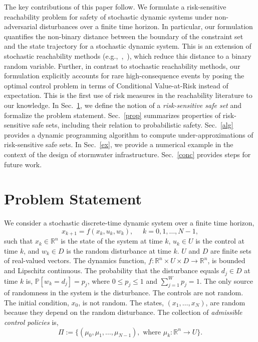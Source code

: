 \documentclass[letterpaper, 10 pt, conference]{ieeeconf}  %
\begin{document}
The key contributions of this paper follow.
We formulate a risk-sensitive reachability problem for safety of stochastic dynamic systems under non-adversarial disturbances
over a finite time horizon. In particular, our formulation quantifies the non-binary distance between the boundary of the constraint set and the
state trajectory for a stochastic dynamic system. This is an extension of stochastic 
reachability methods (e.g.,~\cite{abate2008probabilistic},~\cite{summers2010verification}), which reduce this distance to a binary random variable.
Further, in contrast to stochastic reachability methods, our formulation explicitly accounts for rare high-consequence events by posing the optimal control problem
in terms of Conditional Value-at-Risk instead of expectation. This is the first use of risk measures in the reachability literature to our knowledge.
In Sec.~\ref{problem}, we define the notion of a \textit{risk-sensitive safe set} and formalize the problem statement.
Sec.~\ref{prop} summarizes properties of risk-sensitive safe sets, including their relation to probabilistic safety.
Sec.~\ref{alg} provides a dynamic programming algorithm to compute under-approximations of risk-sensitive safe sets. %
In Sec.~\ref{ex}, we provide a numerical example in the context of the design of stormwater infrastructure. Sec.~\ref{conc} provides steps for future work.

\section{Problem Statement}\label{problem}
We consider a stochastic discrete-time dynamic system over a finite time horizon,\footnotemark
{}
\begin{equation}
x_{k+1} = f(x_k,u_k,w_k), \text{ }\text{ } k = 0, 1, \dots, N-1,
\label{sys}\end{equation}
such that $x_k \in \mathbb{R}^n$ is the state of the system at time $k$,
$u_k \in U$ is the control at time $k$, and
$w_k \in D$ is the random disturbance at time $k$. $U$ and $D$ are finite sets of real-valued vectors.
The dynamics function, $f : \mathbb{R}^n \times U \times D \rightarrow \mathbb{R}^n$, is bounded and Lipschitz continuous.
The probability that the disturbance equals $d_j \in D$ at time $k$ is, $\mathbb{P}[w_k = d_j] = p_j$, 
where $0 \leq p_j \leq 1$ and $\sum_{j=1}^W p_j = 1$.\footnotemark
{}  
The only source of randomness in the system is the disturbance. The controls are not random.
The initial condition, $x_0$, is not random. 
The states, $(x_1, \dots, x_N)$, are random because they depend on the random disturbance. 
The collection of \textit{admissible control policies} is,
\begin{equation}
\Pi := \big\{ (\mu_0, \mu_1, \dots, \mu_{N-1}), \text{ where } \mu_k: \mathbb{R}^n \rightarrow U \big\}.
\label{pi}
\end{equation}
\end{document}
